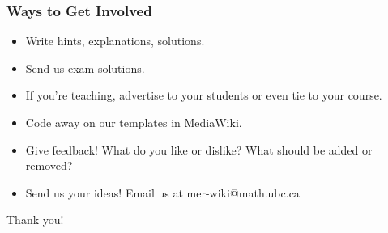 \documentclass{beamer}
\begin{document}
\frame
{
  \frametitle{Ways to Get Involved}

      \begin{itemize}
				\item Write hints, explanations, solutions.
                \item Send us exam solutions.
                \item If you're teaching, advertise to your students or even tie to your course.
                \item Code away on our templates in MediaWiki.
                \item Give feedback! What do you like or dislike? What should be added or removed?
                \item Send us your ideas! Email us at  mer-wiki@math.ubc.ca
      \end{itemize}

      \bigskip

\begin{center}
\pause \alert{Thank you!}
\end{center}
}


\end{document}
